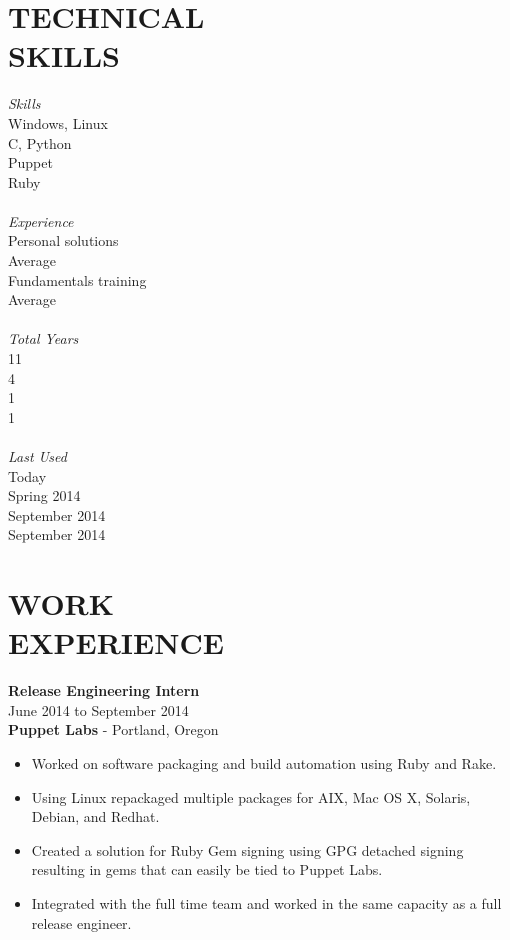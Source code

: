 \documentclass[mm]{res}
\begin{document}
\begin{resume}
\section{TECHNICAL \\ SKILLS} 
\begin{multicols}{4}
	{\sl Skills} \\
	Windows, Linux \\
	C, Python \\ 
	Puppet \\ 
  Ruby \\ \\
	{\sl Experience} \\
	Personal solutions \\
	Average \\ 
	Fundamentals training \\ 
  Average \\ \\
	{\sl Total Years} \\
	11 \\
	4 \\ 
	1 \\ 
  1 \\ \\ 
	{\sl Last Used} \\
	Today \\
	Spring 2014 \\
	September 2014 \\
  September 2014 \\
\end{multicols}
 
\section{WORK \\ EXPERIENCE}  
	\textbf{Release Engineering Intern} \\
	June 2014 to September 2014 \\
	\textbf{Puppet Labs} - Portland, Oregon \\
\begin{itemize} \parskip0pt  \itemsep-8pt
	\item Worked on software packaging and build automation using Ruby and Rake. \\
	\item Using Linux repackaged multiple packages for AIX, Mac OS X, Solaris, Debian, and Redhat. \\
	\item Created a solution for Ruby Gem signing using GPG detached signing resulting in gems that can easily be tied to Puppet Labs. \\
	\item Integrated with the full time team and worked in the same capacity as a full release engineer. \\
\end{itemize}



\end{resume}
\end{document}
